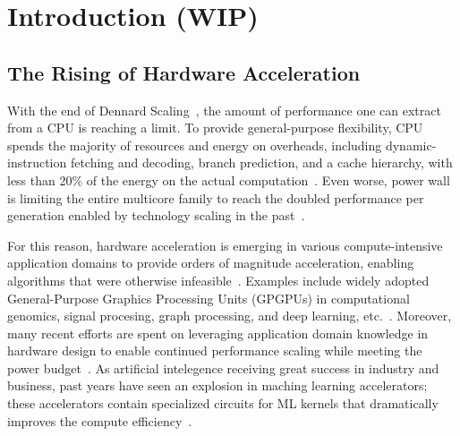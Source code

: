\chapter{Introduction (WIP)}

\section{The Rising of Hardware Acceleration}

With the end of Dennard Scaling~\cite{dennard}, the amount of performance one can extract from a CPU is reaching a limit.
To provide general-purpose flexibility, CPU spends the majority of resources and energy on overheads, 
including dynamic-instruction fetching and decoding, branch prediction, and a cache hierarchy, 
with less than 20\% of 
the energy on the actual computation~\cite{mark}.
Even worse, power wall is limiting the entire multicore family
to reach the doubled performance per generation enabled by technology scaling in the 
past~\cite{multicorescale}.

For this reason, hardware acceleration is emerging in various compute-intensive application domains 
to provide orders of magnitude acceleration, enabling algorithms that were otherwise
infeasible~\cite{genomicaccel, bioaccel, fpgadeeplearn, fpgacripto}.
Examples include widely adopted General-Purpose Graphics Processing Units (GPGPUs) 
in computational genomics, signal procesing, graph processing, and
deep learning, etc.~\cite{genomicaccel, bioaccel, fpgacloudsurvey}.
Moreover, many recent efforts are spent on leveraging application domain knowledge in hardware design to enable 
continued performance scaling while meeting the power budget~\cite{turinglecture}.
As artificial intelegence receiving great success in industry and business,
past years have seen an explosion in maching learning accelerators;
these accelerators contain specialized circuits for ML kernels that dramatically improves the compute
efficiency~\cite{dadiannao,tpu,eie,chen2017eyeriss,tangram,truenorth}.

